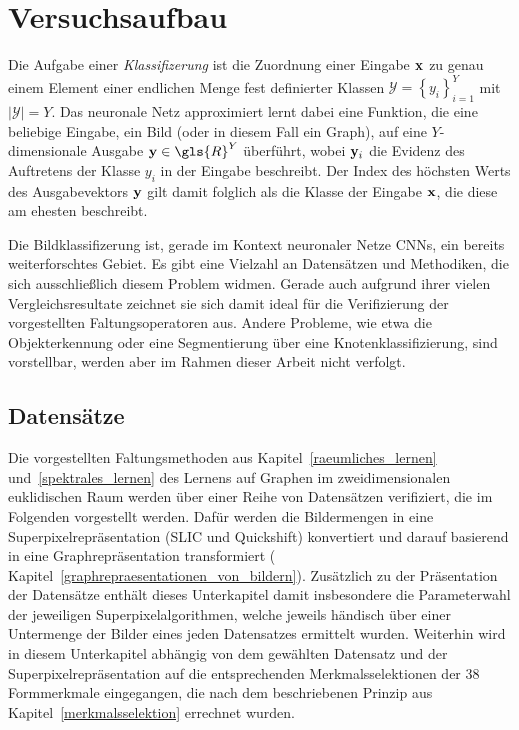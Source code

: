 \section{Versuchsaufbau}
\label{versuchsaufbau}

Die Aufgabe einer \emph{Klassifizerung} ist die Zuordnung einer Eingabe $\mathbf{x}$ zu genau einem Element einer endlichen Menge fest definierter Klassen $\mathcal{Y} = {\left\{y_i\right\}}_{i=1}^Y$ mit $\left|\mathcal{Y}\right| = Y$.
Das neuronale Netz approximiert \bzw{} lernt dabei eine Funktion, die eine beliebige Eingabe, \dhe{} ein Bild (oder in diesem Fall ein Graph), auf eine $Y$-dimensionale Ausgabe $\ve{y} \in \gls{R}^Y$ überführt, wobei $\mathbf{y}_i$ die Evidenz des Auftretens der Klasse $y_i$ in der Eingabe beschreibt.
Der Index des höchsten Werts des Ausgabevektors $\mathbf{y}$ gilt damit folglich als die Klasse der Eingabe $\mathbf{x}$, die diese am ehesten beschreibt.

Die Bildklassifizerung ist, gerade im Kontext neuronaler Netze \bzw{} \glspl{CNN}, ein bereits weiterforschtes Gebiet.
Es gibt eine Vielzahl an Datensätzen und Methodiken, die sich ausschließlich diesem Problem widmen.
Gerade auch aufgrund ihrer vielen Vergleichsresultate zeichnet sie sich damit ideal für die Verifizierung der vorgestellten Faltungsoperatoren aus.
Andere Probleme, wie etwa die Objekterkennung oder eine Segmentierung über eine Knotenklassifizierung, sind vorstellbar, werden aber im Rahmen dieser Arbeit nicht verfolgt.

\subsection{Datensätze}
\label{datensaetze}

Die vorgestellten Faltungsmethoden aus Kapitel~\ref{raeumliches_lernen} und~\ref{spektrales_lernen} \bzgl{} des Lernens auf Graphen im zweidimensionalen euklidischen Raum werden über einer Reihe von Datensätzen verifiziert, die im Folgenden vorgestellt werden.
Dafür werden die Bildermengen in eine Superpixelrepräsentation (\gls{SLIC} und Quickshift) konvertiert und darauf basierend in eine Graphrepräsentation transformiert (\vgl{} Kapitel~\ref{graphrepraesentationen_von_bildern}).
Zusätzlich zu der Präsentation der Datensätze enthält dieses Unterkapitel damit insbesondere die Parameterwahl der jeweiligen Superpixelalgorithmen, welche jeweils händisch über einer Untermenge der Bilder eines jeden Datensatzes ermittelt wurden.
Weiterhin wird in diesem Unterkapitel abhängig von dem gewählten Datensatz und der Superpixelrepräsentation auf die entsprechenden Merkmalsselektionen der $38$ Formmerkmale eingegangen, die nach dem beschriebenen Prinzip aus Kapitel~\ref{merkmalsselektion} errechnet wurden.

